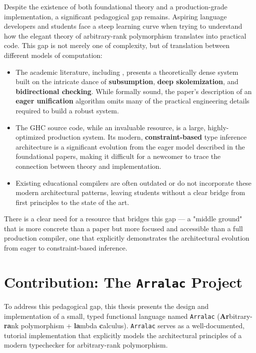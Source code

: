 Despite the existence of both foundational theory and a production-grade implementation, a significant pedagogical gap remains. Aspiring language developers and students face a steep learning curve when trying to understand how the elegant theory of arbitrary-rank polymorphism translates into practical code. This gap is not merely one of complexity, but of translation between different models of computation:
\begin{itemize}
    \item The academic literature, including \cite{jones-practical-2007}, presents a theoretically dense system built on the intricate dance of \textbf{subsumption}, \textbf{deep skolemization}, and \textbf{bidirectional checking}. While formally sound, the paper's description of an \textbf{eager unification} algorithm omits many of the practical engineering details required to build a robust system.
    \item The GHC source code, while an invaluable resource, is a large, highly-optimized production system. Its modern, \textbf{constraint-based} type inference architecture is a significant evolution from the eager model described in the foundational papers, making it difficult for a newcomer to trace the connection between theory and implementation.
    \item Existing educational compilers are often outdated or do not incorporate these modern architectural patterns, leaving students without a clear bridge from first principles to the state of the art.
\end{itemize}
There is a clear need for a resource that bridges this gap --- a "middle ground" that is more concrete than a paper but more focused and accessible than a full production compiler, one that explicitly demonstrates the architectural evolution from eager to constraint-based inference.

\section{Contribution: The \texttt{Arralac} Project}

To address this pedagogical gap, this thesis presents the design and implementation of a small, typed functional language named \texttt{Arralac} (\textbf{Ar}bitrary-\textbf{ra}nk polymorphism + \textbf{la}mbda \textbf{c}alculus). \texttt{Arralac} serves as a well-documented, tutorial implementation that explicitly models the architectural principles of a modern typechecker for arbitrary-rank polymorphism.

